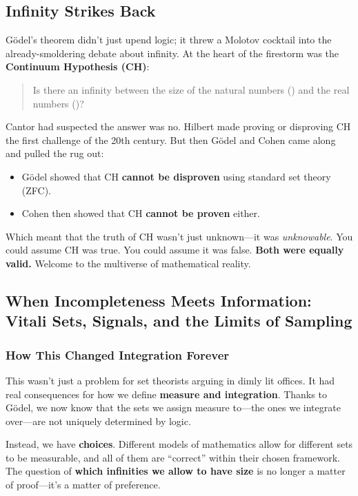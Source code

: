 \subsection{Infinity Strikes Back}

Gödel’s theorem didn’t just upend logic; it threw a Molotov cocktail into the already-smoldering debate about infinity. At the heart of the firestorm was the \textbf{Continuum Hypothesis (CH)}:

\begin{quote}
Is there an infinity between the size of the natural numbers () and the real numbers ()?
\end{quote}

Cantor had suspected the answer was no. Hilbert made proving or disproving CH the first challenge of the 20th century. But then Gödel and Cohen came along and pulled the rug out:

\begin{itemize}
\item Gödel showed that CH \textbf{cannot be disproven} using standard set theory (ZFC).
\item Cohen then showed that CH \textbf{cannot be proven} either.
\end{itemize}

Which meant that the truth of CH wasn’t just unknown—it was \textit{unknowable}. You could assume CH was true. You could assume it was false. \textbf{Both were equally valid.} Welcome to the multiverse of mathematical reality.

\subsection{When Incompleteness Meets Information: Vitali Sets, Signals, and the Limits of Sampling}

\subsubsection{How This Changed Integration Forever}

This wasn’t just a problem for set theorists arguing in dimly lit offices. It had real consequences for how we define \textbf{measure and integration}. Thanks to Gödel, we now know that the sets we assign measure to—the ones we integrate over—are not uniquely determined by logic.

Instead, we have \textbf{choices}. Different models of mathematics allow for different sets to be measurable, and all of them are “correct” within their chosen framework. The question of \textbf{which infinities we allow to have size} is no longer a matter of proof—it’s a matter of preference.

